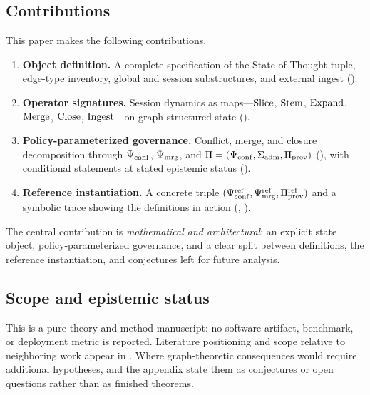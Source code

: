 \subsection{Contributions}
\label{subsec:intro-contributions}

This paper makes the following contributions.
\begin{enumerate}[leftmargin=*]
  \item \textbf{Object definition.} A complete specification of the State of Thought tuple, edge-type inventory, global and session substructures, and external ingest ().
  \item \textbf{Operator signatures.} Session dynamics as maps---$\mathrm{Slice}$, $\mathrm{Stem}$, $\mathrm{Expand}$, $\mathrm{Merge}$, $\mathrm{Close}$, $\mathrm{Ingest}$---on graph-structured state ().
  \item \textbf{Policy-parameterized governance.} Conflict, merge, and closure decomposition through $\Psi_{\mathrm{conf}}$, $\Psi_{\mathrm{mrg}}$, and $\Pi=(\Psi_{\mathrm{conf}},\Sigma_{\mathrm{adm}},\Pi_{\mathrm{prov}})$ (), with conditional statements at stated epistemic status ().
  \item \textbf{Reference instantiation.} A concrete triple $(\Psi_{\mathrm{conf}}^{\mathrm{ref}},\Psi_{\mathrm{mrg}}^{\mathrm{ref}},\Pi_{\mathrm{prov}}^{\mathrm{ref}})$ and a symbolic trace showing the definitions in action (, ).
\end{enumerate}

The central contribution is \emph{mathematical and architectural}: an explicit state object, policy-parameterized governance, and a clear split between definitions, the reference instantiation, and conjectures left for future analysis.

\subsection{Scope and epistemic status}
\label{subsec:intro-scope}

This is a pure theory-and-method manuscript: no software artifact, benchmark, or deployment metric is reported.
Literature positioning and scope relative to neighboring work appear in .
Where graph-theoretic consequences would require additional hypotheses,  and the appendix state them as conjectures or open questions rather than as finished theorems.

